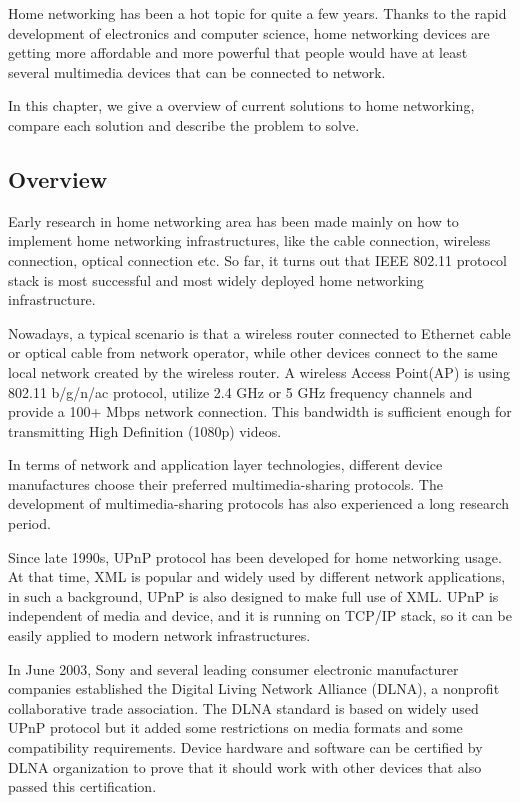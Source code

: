 
Home networking has been a hot topic for quite a few years. Thanks to the rapid development 
of electronics and computer science, home networking devices are getting more affordable 
and more powerful that people would have at least several multimedia devices that can be 
connected to network.

In this chapter, we give a overview of current solutions to home networking,
compare each solution and describe the problem to solve.

\subsection{Overview}
Early research \cite{link_layer_old} \cite{end_user} \cite{link_layer}
 in home networking area  has been made mainly on how to implement home
 networking infrastructures, like the cable connection, wireless connection,
 optical connection etc. So far, it turns out that IEEE 802.11 protocol stack
 is most successful and most widely deployed home networking infrastructure.

Nowadays, a typical scenario is that a wireless router connected to Ethernet
cable or optical cable from network operator, while other devices connect to
the same local network created by the wireless router. A wireless
Access Point(AP) is using 802.11 b/g/n/ac protocol, utilize 2.4 GHz or 5 GHz
frequency channels and provide a 100+ Mbps network connection. This bandwidth
is sufficient enough for transmitting High Definition (1080p) videos.

In terms of network and application layer technologies, different device
manufactures choose their preferred multimedia-sharing protocols. The
development of multimedia-sharing protocols has also experienced a long
research period.

Since late 1990s, UPnP protocol has been developed for home networking usage.
At that time, XML is popular and widely used by different network applications,
in such a background, UPnP is also designed to make full use of XML. UPnP is
independent of media and device, and it is running on TCP/IP stack, so it can
be easily applied to modern network infrastructures.

In June 2003, Sony and several leading consumer electronic manufacturer
companies established the Digital Living Network Alliance (DLNA), a nonprofit
collaborative trade association. The DLNA standard is based on widely used UPnP
protocol but it added some restrictions on media formats and some compatibility
requirements. Device hardware and software can be certified by DLNA
organization to prove that it should work with other devices that also passed
this certification.

